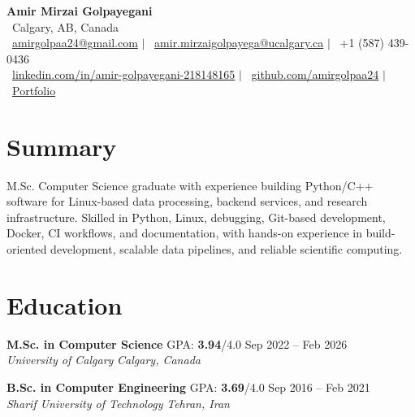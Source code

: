 \documentclass[a4paper,10pt]{article}
\newcommand{\resumeEducationSubheading}[5]{
    \textbf{#1} \hfill #2 \hfill #3 \\
    \textit{#4} \hfill \textit{#5}
}
\begin{document}

\begin{center}
    {\LARGE \textbf{Amir Mirzai Golpayegani}} \\[0.25em]
    \faMapMarker*~Calgary, AB, Canada \\[0.25em]
    \faEnvelope~\href{mailto:amirgolpaa24@gmail.com}{amirgolpaa24@gmail.com}
    $|$
    \faEnvelope~\href{mailto:amir.mirzaigolpayega@ucalgary.ca}{amir.mirzaigolpayega@ucalgary.ca}
    $|$
    \faPhone*~+1 (587) 439-0436 \\[0.25em]
    \faLinkedin~\href{https://linkedin.com/in/amir-golpayegani-218148165}{linkedin.com/in/amir-golpayegani-218148165}
    $|$
    \faGithub~\href{https://github.com/amirgolpaa24}{github.com/amirgolpaa24}
    $|$
    \faGlobe~\href{https://amir-portfolio-navy.vercel.app/}{Portfolio}
\end{center}


\section*{Summary}

M.Sc. Computer Science graduate with experience building Python/C++ software for Linux-based data processing, backend services, and research infrastructure. Skilled in Python, Linux, debugging, Git-based development, Docker, CI workflows, and documentation, with hands-on experience in build-oriented development, scalable data pipelines, and reliable scientific computing.


\section*{Education}

\resumeEducationSubheading
{M.Sc. in Computer Science}
{GPA: \textbf{3.94}/4.0}
{Sep 2022 -- Feb 2026}
{University of Calgary}
{Calgary, Canada}

\vspace{0.35em}

\resumeEducationSubheading
{B.Sc. in Computer Engineering}
{GPA: \textbf{3.69}/4.0}
{Sep 2016 -- Feb 2021}
{Sharif University of Technology}
{Tehran, Iran}

\end{document}
